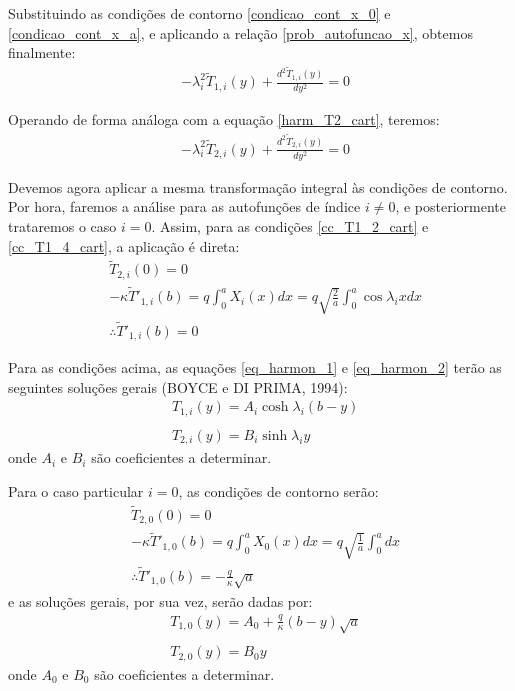 Substituindo as condições de contorno \eqref{condicao_cont_x_0} e \eqref{condicao_cont_x_a}, e aplicando
a relação \eqref{prob_autofuncao_x}, obtemos finalmente:
\begin{align}
	&
 	-
	\lambda_i^2
	\tilde{T}_{1, i}(y)
	+
	\frac{d^2 \tilde{T}_{1, i}(y)}{dy^2}
	=
	0 \label{eq_harmon_1}
\end{align}

Operando de forma análoga com a equação \eqref{harm_T2_cart}, teremos:
\begin{align}
	&
 	-
	\lambda_i^2
	\tilde{T}_{2, i}(y)
	+
	\frac{d^2 \tilde{T}_{2, i}(y)}{dy^2}
	=
	0 \label{eq_harmon_2}
\end{align}

Devemos agora aplicar a mesma transformação integral às condições de contorno. Por hora, faremos a análise para 
as autofunções de índice $i \ne 0$, e posteriormente trataremos o caso $i = 0$. Assim, para as condições \eqref{cc_T1_2_cart}
e \eqref{cc_T1_4_cart}, a aplicação é direta:
\begin{align}
	& \tilde{T}_{2, i}(0) = 0 \\ 
	& -\kappa \tilde{T}'_{1, i}(b) = q\int_0^a X_i(x)dx = q\sqrt{\frac{2}{a}}\int_0^a \cos\lambda_i x dx \nonumber \\
	& \therefore \tilde{T}'_{1, i}(b) = 0
\end{align}

Para as condições acima, as equações \eqref{eq_harmon_1} e \eqref{eq_harmon_2} terão as seguintes soluções gerais (BOYCE e DI PRIMA, 1994): 
\begin{align}
&	T_{1,i}(y) = A_i \cosh\lambda_i (b - y) \\ \nonumber \\
& 	T_{2,i}(y) = B_i\sinh\lambda_i y
\end{align}
onde $A_i$ e $B_i$ são coeficientes a determinar.

Para o caso particular $i=0$, as condições de contorno serão:
\begin{align}
	& \tilde{T}_{2, 0}(0) = 0 \\ 
	& -\kappa \tilde{T}'_{1, 0}(b) = q\int_0^a X_0(x)dx = q\sqrt{\frac{1}{a}}\int_0^a dx \nonumber \\
	& \therefore \tilde{T}'_{1, 0}(b) = -\frac{q}{\kappa}\sqrt{a}
\end{align}
e as soluções gerais, por sua vez, serão dadas por:
\begin{align}
	& T_{1,0}(y) = A_0 + \frac{q}{\kappa}(b - y)\sqrt{a}\\ \nonumber \\
	& T_{2,0}(y) = B_0 y
\end{align}
onde $A_0$ e $B_0$ são coeficientes a determinar.


